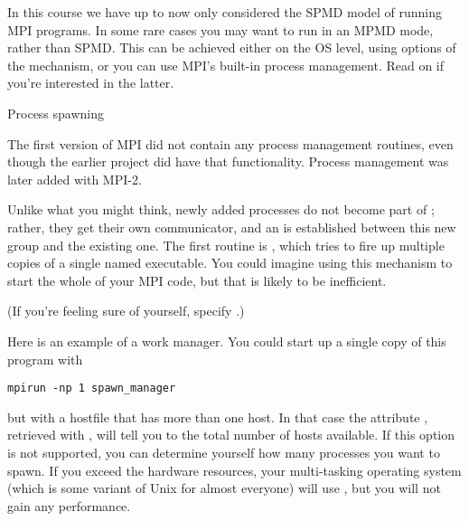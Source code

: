 
In this course we have up to now only considered the \ac{SPMD} model
of running MPI programs.  In some rare cases you may want to run in an
\ac{MPMD} mode, rather than \ac{SPMD}. This can be achieved either on
the \ac{OS} level, using options of the  mechanism,
or you can use MPI's built-in process management. Read on if you're
interested in the latter.

 {Process spawning}
\label{sec:mpi-dynamic}

The first version of MPI did not contain any process management
routines, even though the earlier  project did have
that functionality. Process management was later added with MPI-2.

Unlike what you might think, newly added processes do not become part
of ; rather, they get their own communicator, and an
 is established between this new group
and the existing one. The first routine is
, which tries to fire up multiple copies
of a single named executable. You could imagine using this mechanism
to start the whole of your MPI code, but that is likely to be inefficient.


(If you're feeling sure of yourself, specify .)

Here is an example of a work manager.
%
%
%
You could start up a single copy of this program with 
\begin{verbatim}
mpirun -np 1 spawn_manager
\end{verbatim}
but with a hostfile that has more than one host. In that case the
attribute , retrieved with
, will tell you to the total number of
hosts available. If this option is not supported, you can determine
yourself how many processes you want to spawn. If you exceed the
hardware resources, your multi-tasking operating system (which is some
variant of Unix for almost everyone) will use
, but you will not gain any performance.

